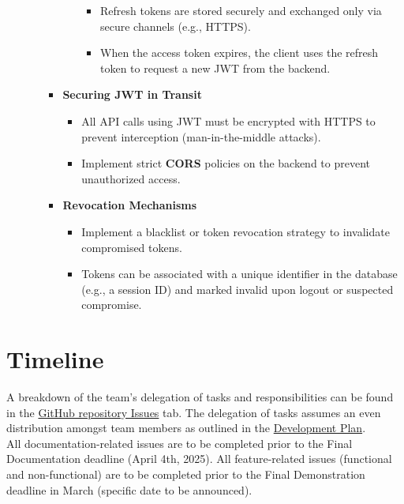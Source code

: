 \documentclass[12pt, titlepage]{article}
\begin{document}
\begin{enumerate}
\begin{itemize}
\begin{itemize}
\begin{itemize}
\begin{itemize}
					\item Refresh tokens are stored securely and exchanged only via secure channels (e.g., HTTPS).
					\item When the access token expires, the client uses the refresh token to request a new JWT from the backend.
				\end{itemize}
			\end{itemize}
			\item \textbf{Securing JWT in Transit}
			\begin{itemize}
				\item All API calls using JWT must be encrypted with HTTPS to prevent interception (man-in-the-middle attacks).
				\item Implement strict \textbf{CORS} policies on the backend to prevent unauthorized access.
			\end{itemize}
			\item \textbf{Revocation Mechanisms}
			\begin{itemize}
				\item Implement a blacklist or token revocation strategy to invalidate compromised tokens.
				\item Tokens can be associated with a unique identifier in the database (e.g., a session ID) and marked invalid upon logout or suspected compromise.
			\end{itemize}
		\end{itemize}
	\end{itemize}
\end{enumerate}

\section{Timeline}

A breakdown of the team's delegation of tasks and responsibilities can be found
in the \href{https://github.com/PlutosCapstone/Plutos/issues}{GitHub repository
Issues} tab. The delegation of tasks assumes an even distribution amongst team
members as outlined in the
\href{https://github.com/PlutosCapstone/Plutos/blob/main/docs/DevelopmentPlan/DevelopmentPlan.pdf}{Development
Plan}. \\

All documentation-related issues are to be completed prior to the Final
Documentation deadline (April 4th, 2025). All feature-related issues (functional
and non-functional) are to be completed prior to the Final Demonstration
deadline in March (specific date to be announced). \\
\end{document}
